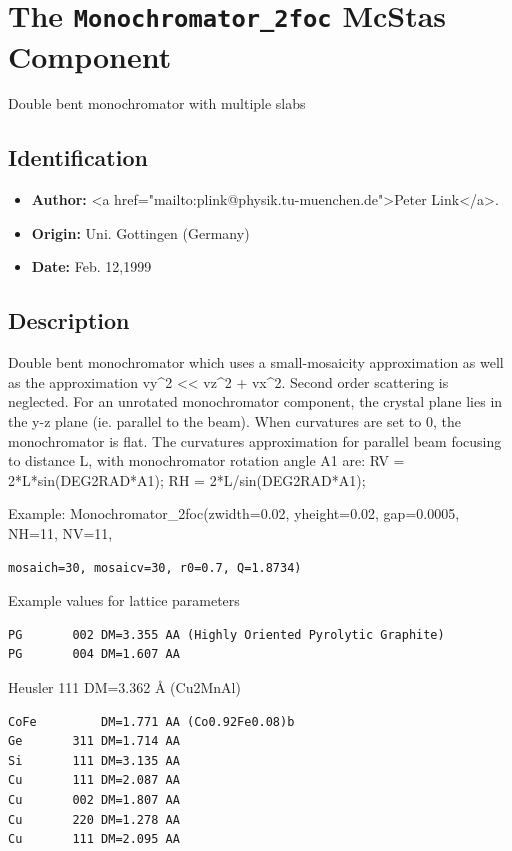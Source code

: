 \section{The \texttt{Monochromator\_2foc} McStas Component}
Double bent monochromator with multiple slabs

\subsection*{Identification}
\begin{itemize}
  \item \textbf{Author:} \textless{}a href="mailto:plink@physik.tu-muenchen.de"\textgreater{}Peter Link\textless{}/a\textgreater{}.
  \item \textbf{Origin:} Uni. Gottingen (Germany)
  \item \textbf{Date:} Feb. 12,1999
\end{itemize}

\subsection*{Description}
Double bent monochromator which uses a small-mosaicity approximation as well as the approximation vy\textasciicircum{}2 \textless{}\textless{} vz\textasciicircum{}2 + vx\textasciicircum{}2. Second order scattering is neglected. For an unrotated monochromator component, the crystal plane lies in the y-z plane (ie. parallel to the beam). When curvatures are set to 0, the monochromator is flat. The curvatures approximation for parallel beam focusing to distance L, with monochromator rotation angle A1 are: RV = 2*L*sin(DEG2RAD*A1); RH = 2*L/sin(DEG2RAD*A1);

Example: Monochromator\_2foc(zwidth=0.02, yheight=0.02, gap=0.0005, NH=11, NV=11,

\begin{verbatim}
mosaich=30, mosaicv=30, r0=0.7, Q=1.8734)
\end{verbatim}

Example values for lattice parameters

\begin{verbatim}
PG       002 DM=3.355 AA (Highly Oriented Pyrolytic Graphite)
PG       004 DM=1.607 AA
\end{verbatim}

Heusler 111 DM=3.362 \AA{} (Cu2MnAl)

\begin{verbatim}
CoFe         DM=1.771 AA (Co0.92Fe0.08)b
Ge       311 DM=1.714 AA
Si       111 DM=3.135 AA
Cu       111 DM=2.087 AA
Cu       002 DM=1.807 AA
Cu       220 DM=1.278 AA
Cu       111 DM=2.095 AA
\end{verbatim}

